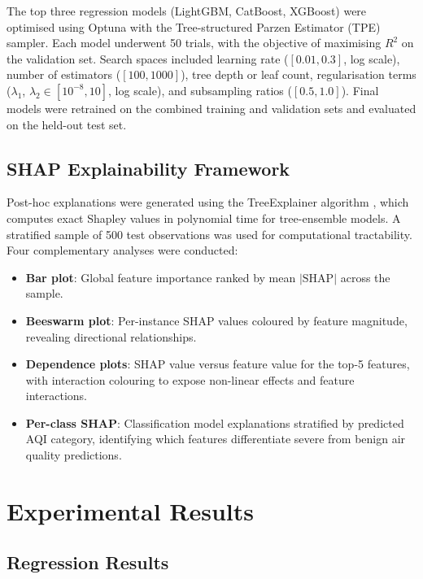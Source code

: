 \documentclass[conference]{IEEEtran}
\begin{document}
The top three regression models (LightGBM, CatBoost, XGBoost) were optimised using Optuna \cite{akiba2019} with the Tree-structured Parzen Estimator (TPE) sampler. Each model underwent 50 trials, with the objective of maximising $R^2$ on the validation set. Search spaces included learning rate ($[0.01, 0.3]$, log scale), number of estimators ($[100, 1000]$), tree depth or leaf count, regularisation terms ($\lambda_1$, $\lambda_2 \in [10^{-8}, 10]$, log scale), and subsampling ratios ($[0.5, 1.0]$). Final models were retrained on the combined training and validation sets and evaluated on the held-out test set.

\subsection{SHAP Explainability Framework}

Post-hoc explanations were generated using the TreeExplainer algorithm \cite{lundberg2020}, which computes exact Shapley values in polynomial time for tree-ensemble models. A stratified sample of 500 test observations was used for computational tractability. Four complementary analyses were conducted:

\begin{itemize}
    \item \textbf{Bar plot}: Global feature importance ranked by mean $|\text{SHAP}|$ across the sample.
    \item \textbf{Beeswarm plot}: Per-instance SHAP values coloured by feature magnitude, revealing directional relationships.
    \item \textbf{Dependence plots}: SHAP value versus feature value for the top-5 features, with interaction colouring to expose non-linear effects and feature interactions.
    \item \textbf{Per-class SHAP}: Classification model explanations stratified by predicted AQI category, identifying which features differentiate severe from benign air quality predictions.
\end{itemize}

\section{Experimental Results}

\subsection{Regression Results}
\end{document}

